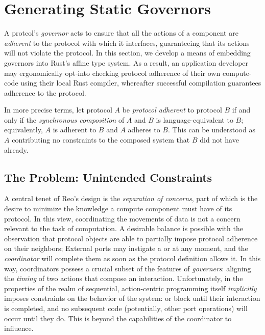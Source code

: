 \chapter{Generating Static Governors}
\label{sec:api}
A protcol's \textit{governor} acts to ensure that all the actions of a component are \textit{adherent} to the protocol with which it interfaces, guaranteeing that its actions will not violate the protocol. In this section, we develop a means of embedding governors into Rust's affine type system. As a result, an application developer may ergonomically opt-into checking protocol adherence of their own compute-code using their local Rust compiler, whereafter successful compilation guarantees adherence to the protocol.

In more precise terms, let protocol $A$ be \textit{protocol adherent} to protocol $B$ if and only if the \textit{synchronous composition} of $A$ and $B$ is language-equivalent to $B$; equivalently, $A$ is adherent to $B$ and $A$ adheres to $B$. This can be understood as $A$ contributing no constraints to the composed system that $B$ did not have already.

\section{The Problem: Unintended Constraints}
\label{sec:unintended_constraints}
A central tenet of Reo's design is the \textit{separation of concerns}, part of which is the desire to minimize the knowledge a compute component must have of its protocol. In this view, coordinating the movements of data is not a concern relevant to the task of computation. A desirable balance is possible with the observation that protocol objects are able to partially impose protocol adherence on their neighbors; External ports may instigate a  or  at any moment, and the \textit{coordinator} will complete them as soon as the protocol definition allows it. In this way, coordinators possess a crucial subset of the features of \textit{governers}: aligning the \textit{timing} of two actions that compose an interaction. Unfortunately, in the properties of the realm of sequential, action-centric programming itself \textit{implicitly} imposes constraints on the behavior of the system:  or  block until their interaction is completed, and no subsequent code (potentially, other port operations) will occur until they do. This is beyond the capabilities of the coordinator to influence.


